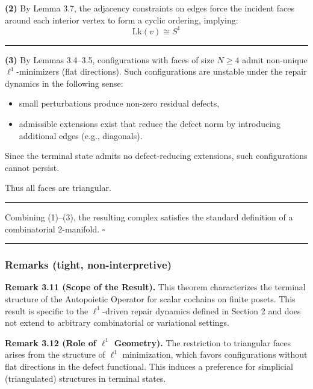 \documentclass[
]{article}
\providecommand{\tightlist}{%
  \setlength{\itemsep}{0pt}\setlength{\parskip}{0pt}}
\begin{document}
\textbf{(2)} By Lemma 3.7, the adjacency constraints on edges force the
incident faces around each interior vertex to form a cyclic ordering,
implying: \[ \mathrm{Lk}(v) \cong S^1 \]

\begin{center}\rule{0.5\linewidth}{0.5pt}\end{center}

\textbf{(3)} By Lemmas 3.4--3.5, configurations with faces of size
\(N \geq 4\) admit non-unique \(\ell^1\)-minimizers (flat directions).
Such configurations are unstable under the repair dynamics in the
following sense:

\begin{itemize}
\tightlist
\item
  small perturbations produce non-zero residual defects,
\item
  admissible extensions exist that reduce the defect norm by introducing
  additional edges (e.g., diagonals).
\end{itemize}

Since the terminal state admits no defect-reducing extensions, such
configurations cannot persist.

Thus all faces are triangular.

\begin{center}\rule{0.5\linewidth}{0.5pt}\end{center}

Combining (1)--(3), the resulting complex satisfies the standard
definition of a combinatorial 2-manifold. \(\square\)

\begin{center}\rule{0.5\linewidth}{0.5pt}\end{center}

\subsubsection{Remarks (tight,
non-interpretive)}\label{remarks-tight-non-interpretive}

\textbf{Remark 3.11 (Scope of the Result).} This theorem characterizes
the terminal structure of the Autopoietic Operator for scalar cochains
on finite posets. This result is specific to the \(\ell^1\)-driven
repair dynamics defined in Section 2 and does not extend to arbitrary
combinatorial or variational settings.

\textbf{Remark 3.12 (Role of \(\ell^1\) Geometry).} The restriction to
triangular faces arises from the structure of \(\ell^1\) minimization,
which favors configurations without flat directions in the defect
functional. This induces a preference for simplicial (triangulated)
structures in terminal states.
\end{document}
